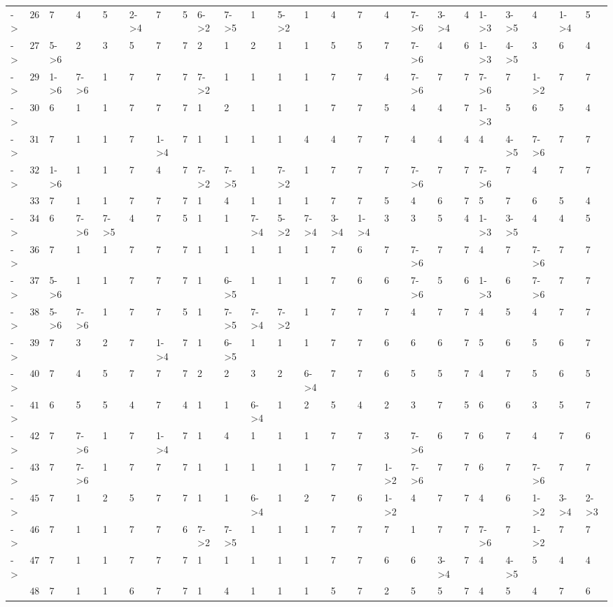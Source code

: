 \documentclass[6pt]{article}
\begin{document}
\begin{landscape}
{\begin{longtable}{lrllllllllllllllllllllll}
-\textgreater &$ 26$&7&4&5&2-\textgreater 4&7&5&6-\textgreater 2&7-\textgreater 5&1&5-\textgreater 2&1&4&7&4&7-\textgreater 6&3-\textgreater 4&4&1-\textgreater 3&3-\textgreater 5&4&1-\textgreater 4&5\tabularnewline
-\textgreater &$ 27$&5-\textgreater 6&2&3&5&7&7&2&1&2&1&1&5&5&7&7-\textgreater 6&4&6&1-\textgreater 3&4-\textgreater 5&3&6&4\tabularnewline
-\textgreater &$ 29$&1-\textgreater 6&7-\textgreater 6&1&7&7&7&7-\textgreater 2&1&1&1&1&7&7&4&7-\textgreater 6&7&7&7-\textgreater 6&7&1-\textgreater 2&7&7\tabularnewline
-\textgreater &$ 30$&6&1&1&7&7&7&1&2&1&1&1&7&7&5&4&4&7&1-\textgreater 3&5&6&5&4\tabularnewline
-\textgreater &$ 31$&7&1&1&7&1-\textgreater 4&7&1&1&1&1&4&4&7&7&4&4&4&4&4-\textgreater 5&7-\textgreater 6&7&7\tabularnewline
-\textgreater &$ 32$&1-\textgreater 6&1&1&7&4&7&7-\textgreater 2&7-\textgreater 5&1&7-\textgreater 2&1&7&7&7&7-\textgreater 6&7&7&7-\textgreater 6&7&4&7&7\tabularnewline
&$ 33$&7&1&1&7&7&7&1&4&1&1&1&7&7&5&4&6&7&5&7&6&5&4\tabularnewline
-\textgreater &$ 34$&6&7-\textgreater 6&7-\textgreater 5&4&7&5&1&1&7-\textgreater 4&5-\textgreater 2&7-\textgreater 4&3-\textgreater 4&1-\textgreater 4&3&3&5&4&1-\textgreater 3&3-\textgreater 5&4&4&5\tabularnewline
-\textgreater &$ 36$&7&1&1&7&7&7&1&1&1&1&1&7&6&7&7-\textgreater 6&7&7&4&7&7-\textgreater 6&7&7\tabularnewline
-\textgreater &$ 37$&5-\textgreater 6&1&1&7&7&7&1&6-\textgreater 5&1&1&1&7&6&6&7-\textgreater 6&5&6&1-\textgreater 3&6&7-\textgreater 6&7&7\tabularnewline
-\textgreater &$ 38$&5-\textgreater 6&7-\textgreater 6&1&7&7&5&1&7-\textgreater 5&7-\textgreater 4&7-\textgreater 2&1&7&7&7&4&7&7&4&5&4&7&7\tabularnewline
-\textgreater &$ 39$&7&3&2&7&1-\textgreater 4&7&1&6-\textgreater 5&1&1&1&7&7&6&6&6&7&5&6&5&6&7\tabularnewline
-\textgreater &$ 40$&7&4&5&7&7&7&2&2&3&2&6-\textgreater 4&7&7&6&5&5&7&4&7&5&6&5\tabularnewline
-\textgreater &$ 41$&6&5&5&4&7&4&1&1&6-\textgreater 4&1&2&5&4&2&3&7&5&6&6&3&5&7\tabularnewline
-\textgreater &$ 42$&7&7-\textgreater 6&1&7&1-\textgreater 4&7&1&4&1&1&1&7&7&3&7-\textgreater 6&6&7&6&7&4&7&6\tabularnewline
-\textgreater &$ 43$&7&7-\textgreater 6&1&7&7&7&1&1&1&1&1&7&7&1-\textgreater 2&7-\textgreater 6&7&7&6&7&7-\textgreater 6&7&7\tabularnewline
-\textgreater &$ 45$&7&1&2&5&7&7&1&1&6-\textgreater 4&1&2&7&6&1-\textgreater 2&4&7&7&4&6&1-\textgreater 2&3-\textgreater 4&2-\textgreater 3\tabularnewline
-\textgreater &$ 46$&7&1&1&7&7&6&7-\textgreater 2&7-\textgreater 5&1&1&1&7&7&7&1&7&7&7-\textgreater 6&7&1-\textgreater 2&7&7\tabularnewline
\newpage
-\textgreater &$ 47$&7&1&1&7&7&7&1&1&1&1&1&7&7&6&6&3-\textgreater 4&7&4&4-\textgreater 5&5&4&4\tabularnewline
&$ 48$&7&1&1&6&7&7&1&4&1&1&1&5&7&2&5&5&7&4&5&4&7&6\tabularnewline

\end{longtable}}
\end{landscape}
\end{document}
